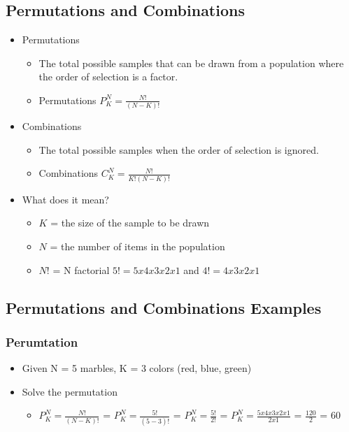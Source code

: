 \documentclass[]{article}
\begin{document}
\subsection{Permutations and
Combinations}\label{permutations-and-combinations}

\begin{itemize}
\itemsep1pt\parskip0pt
\item
  Permutations

  \begin{itemize}
  \itemsep1pt\parskip0pt
  \item
    The total possible samples that can be drawn from a population where
    the order of selection is a factor.
  \item
    Permutations $P_K^N = \frac{N!}{(N-K)!}$
  \end{itemize}
\item
  Combinations

  \begin{itemize}
  \itemsep1pt\parskip0pt
  \item
    The total possible samples when the order of selection is ignored.
  \item
    Combinations $C_K^N = \frac{N!}{K!(N-K)!}$
  \end{itemize}
\item
  What does it mean?

  \begin{itemize}
  \itemsep1pt\parskip0pt
  \item
    $K$ = the size of the sample to be drawn
  \item
    $N$ = the number of items in the population
  \item
    $N!$ = N factorial $5! = 5 x 4 x 3 x 2 x 1$ and $4! = 4 x 3 x 2 x 1$
  \end{itemize}
\end{itemize}

\subsection{Permutations and Combinations
Examples}\label{permutations-and-combinations-examples}

\subsubsection{Perumtation}\label{perumtation}

\begin{itemize}
\itemsep1pt\parskip0pt
\item
  Given N = 5 marbles, K = 3 colors (red, blue, green)
\item
  Solve the permutation

  \begin{itemize}
  \itemsep1pt\parskip0pt
  \item
    $P_K^N = \frac{N!}{(N-K)!}$ = $P_K^N = \frac{5!}{(5-3)!}$ =
    $P_K^N = \frac{5!}{2!}$ = $P_K^N = \frac{5 x 4 x 3 x 2 x 1}{2 x 1}$
    = $\frac{120}{2}$ = $60$
  \end{itemize}
\end{itemize}
\end{document}
